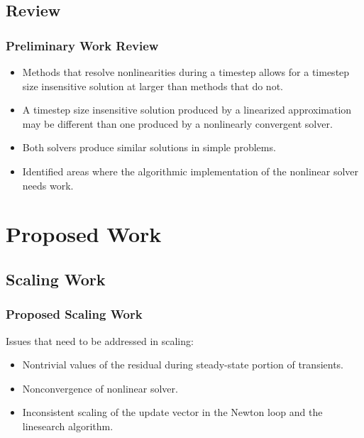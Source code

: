 \documentclass[compress,xcolor=table]{beamer}
\begin{document}
\subsection[Review]{Review}
\begin{frame}
\frametitle{Preliminary Work Review}

\begin{itemize}
\item{Methods that resolve nonlinearities during a timestep allows for a timestep size insensitive solution at larger \dtmax{} than methods that do not.}
\item{A timestep size insensitive solution produced by a linearized approximation may be different than one produced by a nonlinearly convergent solver.}
\item{Both solvers produce similar solutions in simple problems.}
\item{Identified areas where the algorithmic implementation of the nonlinear solver needs work.}
\end{itemize}

\end{frame}
\section[Proposed Work]{Proposed Work}
\subsection[Scaling]{Scaling Work}
\begin{frame}
\frametitle{Proposed Scaling Work}

Issues that need to be addressed in scaling:
\begin{itemize}
\item{Nontrivial values of the residual during steady-state portion of transients.}
\item{Nonconvergence of nonlinear solver.}
\item{Inconsistent scaling of the update vector in the Newton loop and the linesearch algorithm.} 
\end{itemize}

\end{frame}
\end{document}

